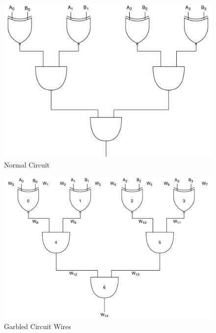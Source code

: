 \documentclass[times]{article}
\begin{document}
	\begin{figure}
		\caption{Normal Circuit}
		\label{fig:normal_circuit}
		\includegraphics[width=\textwidth]{images/equal_circuit.pdf}
	\end{figure}

	\begin{figure}
		\caption{Garbled Circuit Wires}
		\label{fig:garbled_circuit}
		\includegraphics[width=\textwidth]{images/garbled_circuit.pdf}
	\end{figure}
\end{document}
